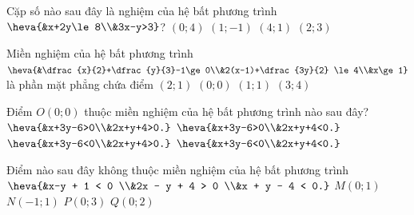 

\begin{ex}%
	Cặp số nào sau đây là nghiệm của hệ bất phương trình $\heva{&x+2y\le 8\\&3x-y>3}$? 
	 \choice
		{$(0;4)$} 
		{$(1;-1)$} 
		{\True $(4;1)$} 
		{$(2;3)$} 
\end{ex}

\begin{ex}%
	Miền nghiệm của hệ bất phương trình $\heva{&\dfrac{x}{2}+\dfrac{y}{3}-1\ge 0\\&2(x-1)+\dfrac{3y}{2} \le  4\\&x\ge 1}$ là phần mặt phẳng chứa điểm
	 \choice
		 {\True $(2;1)$}
		 {$(0;0)$}
		{$(1;1)$} 
		 {$(3;4)$}
\end{ex}

\begin{ex}%
	Điểm $O(0;0)$ thuộc miền  nghiệm của hệ bất phương trình nào sau đây?
	\def\dotEX{} 
	 \choice
		 {$\heva{&x+3y-6>0\\&2x+y+4>0.}$}
		 {$\heva{&x+3y-6>0\\&2x+y+4<0.}$}
		 {\True $\heva{&x+3y-6<0\\&2x+y+4>0.}$}
		 {$\heva{&x+3y-6<0\\&2x+y+4<0.}$}
\end{ex}

\begin{ex}%
	Điểm nào sau đây  không thuộc miền nghiệm của hệ bất phương trình
	$\heva{&x-y + 1 < 0  \\&2x - y + 4 > 0 \\&x + y - 4 < 0.}$
	\choice 
		 {\True $M(0;1)$}
		{$N(-1;1)$} 
		 {$P(0;3)$}
		{$Q(0;2)$} 
\end{ex}

